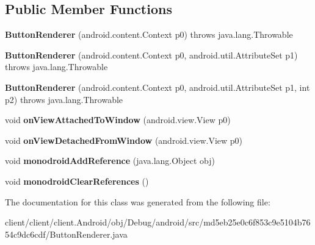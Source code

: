 \subsection*{Public Member Functions}
\begin{DoxyCompactItemize}
\item 
\hypertarget{classmd5eb25e0c6f853c9e5104b7654c9dc6cdf_1_1ButtonRenderer_a72daa94e48d32fe40da9dafb63cbf76c}{}{\bfseries Button\+Renderer} (android.\+content.\+Context p0)  throws java.\+lang.\+Throwable 	\label{classmd5eb25e0c6f853c9e5104b7654c9dc6cdf_1_1ButtonRenderer_a72daa94e48d32fe40da9dafb63cbf76c}

\item 
\hypertarget{classmd5eb25e0c6f853c9e5104b7654c9dc6cdf_1_1ButtonRenderer_aa8444d3c37fd9d3eaebf6dc0b0267794}{}{\bfseries Button\+Renderer} (android.\+content.\+Context p0, android.\+util.\+Attribute\+Set p1)  throws java.\+lang.\+Throwable 	\label{classmd5eb25e0c6f853c9e5104b7654c9dc6cdf_1_1ButtonRenderer_aa8444d3c37fd9d3eaebf6dc0b0267794}

\item 
\hypertarget{classmd5eb25e0c6f853c9e5104b7654c9dc6cdf_1_1ButtonRenderer_a142dc7ed58a147797a788ae0aac12318}{}{\bfseries Button\+Renderer} (android.\+content.\+Context p0, android.\+util.\+Attribute\+Set p1, int p2)  throws java.\+lang.\+Throwable 	\label{classmd5eb25e0c6f853c9e5104b7654c9dc6cdf_1_1ButtonRenderer_a142dc7ed58a147797a788ae0aac12318}

\item 
\hypertarget{classmd5eb25e0c6f853c9e5104b7654c9dc6cdf_1_1ButtonRenderer_abea2efc6958873dfc9dd59c9d61a3870}{}void {\bfseries on\+View\+Attached\+To\+Window} (android.\+view.\+View p0)\label{classmd5eb25e0c6f853c9e5104b7654c9dc6cdf_1_1ButtonRenderer_abea2efc6958873dfc9dd59c9d61a3870}

\item 
\hypertarget{classmd5eb25e0c6f853c9e5104b7654c9dc6cdf_1_1ButtonRenderer_a6b997d007dda60133fb91cff945f0375}{}void {\bfseries on\+View\+Detached\+From\+Window} (android.\+view.\+View p0)\label{classmd5eb25e0c6f853c9e5104b7654c9dc6cdf_1_1ButtonRenderer_a6b997d007dda60133fb91cff945f0375}

\item 
\hypertarget{classmd5eb25e0c6f853c9e5104b7654c9dc6cdf_1_1ButtonRenderer_a7a7354a7382608dbcd26a608eef33766}{}void {\bfseries monodroid\+Add\+Reference} (java.\+lang.\+Object obj)\label{classmd5eb25e0c6f853c9e5104b7654c9dc6cdf_1_1ButtonRenderer_a7a7354a7382608dbcd26a608eef33766}

\item 
\hypertarget{classmd5eb25e0c6f853c9e5104b7654c9dc6cdf_1_1ButtonRenderer_a10ad7030d97ce3f5d1737292e5076d22}{}void {\bfseries monodroid\+Clear\+References} ()\label{classmd5eb25e0c6f853c9e5104b7654c9dc6cdf_1_1ButtonRenderer_a10ad7030d97ce3f5d1737292e5076d22}

\end{DoxyCompactItemize}


The documentation for this class was generated from the following file\+:\begin{DoxyCompactItemize}
\item 
client/client/client.\+Android/obj/\+Debug/android/src/md5eb25e0c6f853c9e5104b7654c9dc6cdf/Button\+Renderer.\+java\end{DoxyCompactItemize}
